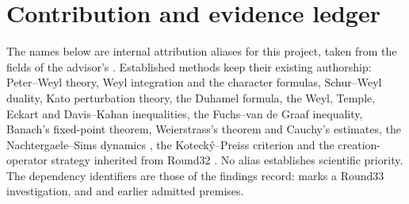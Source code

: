 \section{Contribution and evidence ledger}
\label{sec:contributions}

The names below are internal attribution aliases for this project, taken from
the  fields of the advisor's
. Established
methods keep their existing authorship: Peter--Weyl theory, Weyl integration
and the character formulas, Schur--Weyl duality, Kato perturbation theory, the
Duhamel formula, the Weyl, Temple, Eckart and Davis--Kahan inequalities, the
Fuchs--van de Graaf inequality, Banach's fixed-point theorem, Weierstrass's
theorem and Cauchy's estimates, the Nachtergaele--Sims dynamics \cite{ns}, the
Kotecký--Preiss criterion \cite{kp,ueltschi} and the creation-operator strategy
inherited from Round32 \cite{r32add,gauvin}. No alias establishes scientific
priority. The dependency identifiers are those of the findings record:
 marks a Round33 investigation, and  and
 earlier admitted premises.

